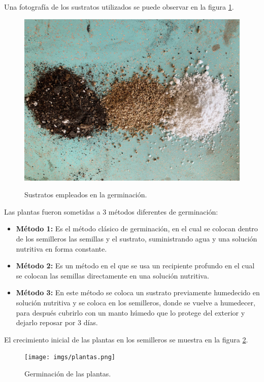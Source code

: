 Una fotografía de los sustratos utilizados se puede observar en la figura \ref{sustratos}.
 \begin{figure}[!ht]
\centering
         \includegraphics[scale=0.15]{imgs/sustrato.jpeg} \\
    \caption{Sustratos empleados en la germinación. }\label{sustratos}
\end{figure}
\newpage

Las plantas fueron sometidas a 3 métodos diferentes de germinación:

\begin{itemize}
    \item\textbf{Método 1:} Es el método clásico de germinación, en el cual se colocan dentro de los semilleros las semillas y el sustrato, suministrando agua y una solución nutritiva en forma constante.
    \item \textbf{Método 2:} Es un método en el que se usa un recipiente profundo en el cual se colocan las semillas directamente en una solución nutritiva.
    \item \textbf{Método 3:} En este método se coloca un sustrato previamente humedecido en solución nutritiva y se coloca en los semilleros, donde se vuelve a humedecer, para después cubrirlo con un manto húmedo que lo protege del exterior y dejarlo reposar por 3 días.
\end{itemize}

El crecimiento inicial de las plantas en los semilleros se muestra en la figura \ref{plantas}.
 \begin{figure}[!ht]
\centering
         \texttt{[image: imgs/plantas.png]} \\
    \caption{Germinación de las plantas.}\label{plantas}
\end{figure}

